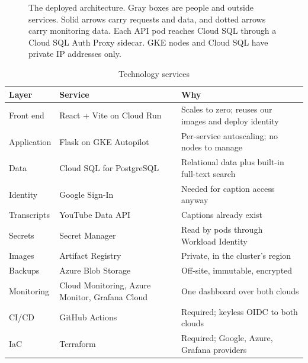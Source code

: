 \documentclass[conference]{IEEEtran}
\begin{document}
\begin{figure}[!t]
\caption{The deployed architecture. Gray boxes are people and outside
services. Solid arrows carry requests and data, and dotted arrows carry
monitoring data. Each API pod reaches Cloud SQL through a Cloud SQL Auth
Proxy sidecar. GKE nodes and Cloud SQL have private IP addresses only.}
\label{fig:arch}
\end{figure}

\begin{table}[!t]
\caption{Technology services}
\label{tab:services}
\centering\footnotesize
\begin{tabularx}{\columnwidth}{@{}l>{\raggedright\arraybackslash}p{2.2cm}X@{}}
\toprule
Layer & Service & Why \\
\midrule
Front end & React + Vite on Cloud Run & Scales to zero; reuses our images and deploy identity \\
Application & Flask on GKE Autopilot & Per-service autoscaling; no nodes to manage \\
Data & Cloud SQL for PostgreSQL & Relational data plus built-in full-text search \\
Identity & Google Sign-In & Needed for caption access anyway \\
Transcripts & YouTube Data API & Captions already exist \\
Secrets & Secret Manager & Read by pods through Workload Identity \\
Images & Artifact Registry & Private, in the cluster's region \\
Backups & Azure Blob Storage & Off-site, immutable, encrypted \\
Monitoring & Cloud Monitoring, Azure Monitor, Grafana Cloud & One dashboard over both clouds \\
CI/CD & GitHub Actions & Required; keyless OIDC to both clouds \\
IaC & Terraform & Required; Google, Azure, Grafana providers \\
\bottomrule
\end{tabularx}
\end{table}
\end{document}
